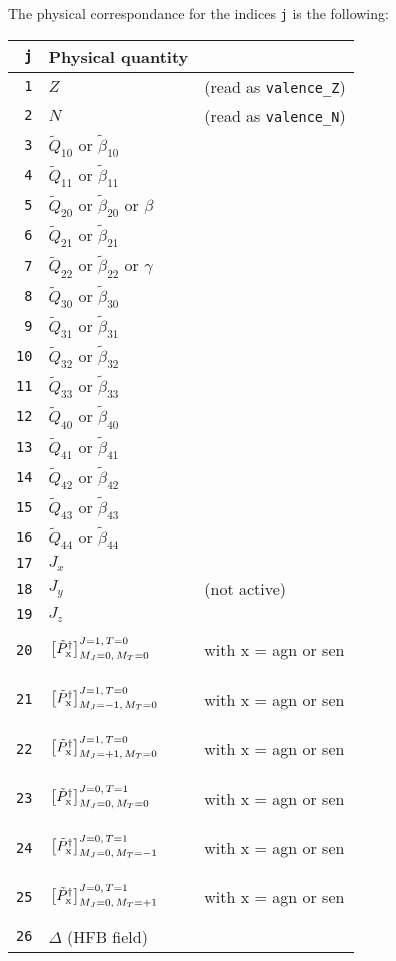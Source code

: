\documentclass[a4paper,11pt]{article}
\newcommand{\ttt}[1]{\texttt{#1}}
\begin{document}
The physical correspondance for the indices \ttt{j} is the following:
\begin{center}
\begin{tabular}{|r|ll|}
\hline
 \ttt{j} & Physical quantity &\\
\hline
 \ttt{ 1} & $Z$ &(read as \ttt{valence\_Z}) \\
 \ttt{ 2} & $N$ &(read as \ttt{valence\_N}) \\
 \ttt{ 3} & $\tilde{Q}_{10}$ or $\tilde{\beta}_{10}$ &\\
 \ttt{ 4} & $\tilde{Q}_{11}$ or $\tilde{\beta}_{11}$ &\\
 \ttt{ 5} & $\tilde{Q}_{20}$ or $\tilde{\beta}_{20}$ or $\beta$ &\\
 \ttt{ 6} & $\tilde{Q}_{21}$ or $\tilde{\beta}_{21}$ &\\
 \ttt{ 7} & $\tilde{Q}_{22}$ or $\tilde{\beta}_{22}$ or $\gamma$ &\\
 \ttt{ 8} & $\tilde{Q}_{30}$ or $\tilde{\beta}_{30}$ &\\
 \ttt{ 9} & $\tilde{Q}_{31}$ or $\tilde{\beta}_{31}$ &\\
 \ttt{10} & $\tilde{Q}_{32}$ or $\tilde{\beta}_{32}$ &\\
 \ttt{11} & $\tilde{Q}_{33}$ or $\tilde{\beta}_{33}$ &\\
 \ttt{12} & $\tilde{Q}_{40}$ or $\tilde{\beta}_{40}$ &\\
 \ttt{13} & $\tilde{Q}_{41}$ or $\tilde{\beta}_{41}$ &\\
 \ttt{14} & $\tilde{Q}_{42}$ or $\tilde{\beta}_{42}$ &\\
 \ttt{15} & $\tilde{Q}_{43}$ or $\tilde{\beta}_{43}$ &\\
 \ttt{16} & $\tilde{Q}_{44}$ or $\tilde{\beta}_{44}$ &\\
 \ttt{17} & $J_x$ & \\
 \ttt{18} & $J_y$ & (not active) \\
 \ttt{19} & $J_z$ & \\
 \ttt{20} & $\vphantom{\Bigg(} \left[ \tilde{P}^\dagger_{\text{x}} \right]^{J=1,\, T=0}_{M_J =0,\,  M_T =0}$ &with x = agn or sen \\
 \ttt{21} & $\vphantom{\Bigg(} \left[ \tilde{P}^\dagger_{\text{x}} \right]^{J=1,\, T=0}_{M_J =-1,\, M_T =0}$ &with x = agn or sen \\
 \ttt{22} & $\vphantom{\Bigg(} \left[ \tilde{P}^\dagger_{\text{x}} \right]^{J=1,\, T=0}_{M_J =+1,\, M_T =0}$ &with x = agn or sen \\
 \ttt{23} & $\vphantom{\Bigg(} \left[ \tilde{P}^\dagger_{\text{x}} \right]^{J=0,\, T=1}_{M_J =0,\, M_T =0}$  &with x = agn or sen \\
 \ttt{24} & $\vphantom{\Bigg(} \left[ \tilde{P}^\dagger_{\text{x}} \right]^{J=0,\, T=1}_{M_J =0,\, M_T =-1}$ &with x = agn or sen \\
 \ttt{25} & $\vphantom{\Bigg(} \left[ \tilde{P}^\dagger_{\text{x}} \right]^{J=0,\, T=1}_{M_J =0,\, M_T =+1}$ &with x = agn or sen \\
 \ttt{26} & $\Delta$ (HFB field) & \\
\hline
\end{tabular}
\end{center}
\end{document}
